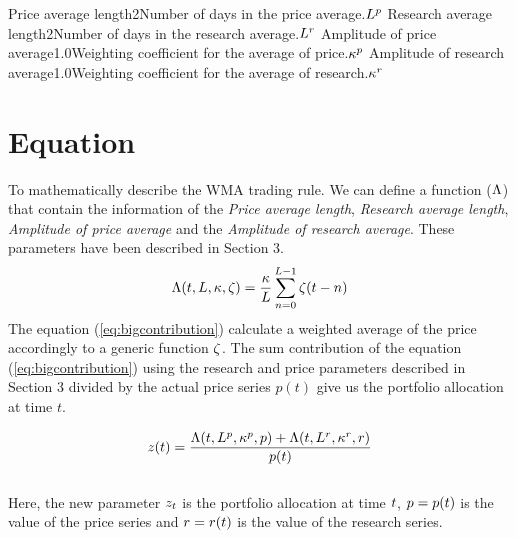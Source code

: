 \documentclass{article}
\begin{document}
{Price average length}{2}{Number of days in the price average.}{$L^{p}$}
{Research average length}{2}{Number of days in the research average.}{$L^{r}$}
{Amplitude of price average}{1.0}{Weighting coefficient for the average of price.}{$\kappa^{p}$}
{Amplitude of research average}{1.0}{Weighting coefficient for the average of research.}{$\kappa^{r}$}
\stoptable

\section{Equation}


To mathematically describe the WMA trading rule. We can define a function ($\Lambda$) that contain the information of the \textit{Price average length}, \textit{Research average length}, \textit{Amplitude of price average} and the \textit{Amplitude of research average}. These parameters  have been described in Section 3. 
\begin{equation} \label{eq:bigcontribution}
\Lambda(t, L, \kappa, \zeta) = \frac{\kappa}{L} \sum_{n=0}^{L-1} \zeta(t - n)
\end{equation}
 The equation (\ref{eq:bigcontribution}) calculate a weighted average of the price accordingly to a generic function $\zeta$. The sum contribution of the equation (\ref{eq:bigcontribution}) using the research and price parameters described in Section 3 divided by the actual price series $p(t)$ give us the portfolio allocation at time $t$.
 
 

\begin{equation}
z(t) = \frac{\Lambda(t, L^{p}, \kappa^{p}, p)+\Lambda(t, L^{r}, \kappa^{r}, r)}{p(t)}
\end{equation}
\\ %
Here, the new parameter $z_t$ is the portfolio allocation at time $t$, $p = p(t)$ is the value of the price series and $r = r(t)$ is the value of the research series.

\hspace{200mm}
\hspace{200mm}

\keyterms

\furtherlinks %
\end{document}
